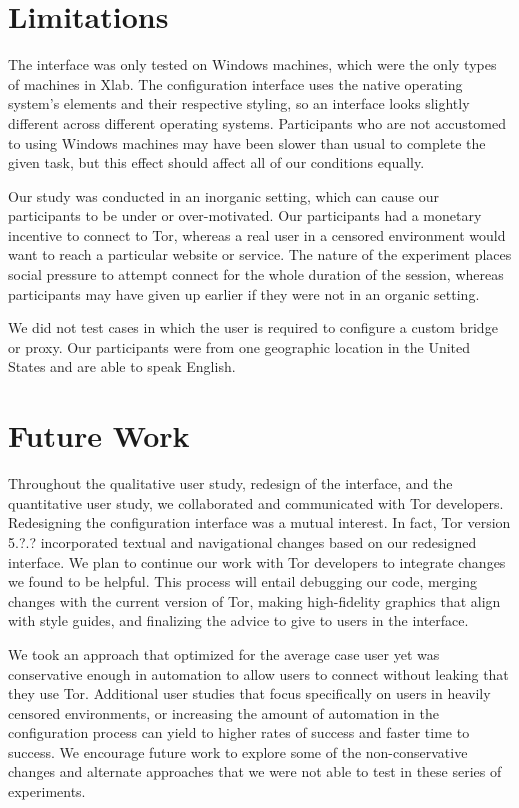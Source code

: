 \documentclass[USenglish,oneside,twocolumn]{article}
\begin{document}
\section{Limitations} 
The interface was only tested on Windows machines, which were the only types of machines in Xlab. The configuration interface uses the native operating system's elements and their respective styling, so an interface looks slightly different across different operating systems. Participants who are not accustomed to using Windows machines may have been slower than usual to complete the given task, but this effect should affect all of our conditions equally. 

Our study was conducted in an inorganic setting, which can cause our participants to be under or over-motivated. Our participants had a monetary incentive to connect to Tor, whereas a real user in a censored environment would want to reach a particular website or service. The nature of the experiment places social pressure to attempt connect for the whole duration of the session, whereas participants may have given up earlier if they were not in an organic setting.   

We did not test cases in which the user is required to configure a custom bridge or proxy. Our participants were from one geographic location in the United States and are able to speak English.

\section{Future Work} 
Throughout the qualitative user study, redesign of the interface, and the quantitative user study, we collaborated and communicated with Tor developers. Redesigning the configuration interface was a mutual interest. In fact, Tor version {\color{red} 5.?.?} incorporated textual and navigational changes based on our redesigned interface. We plan to continue our work with Tor developers to integrate changes we found to be helpful. This process will entail debugging our code, merging changes with the current version of Tor, making high-fidelity graphics that align with style guides, and finalizing the advice to give to users in the interface. 

We took an approach that optimized for the average case user yet was conservative enough in automation to allow users to connect without leaking that they use Tor. Additional user studies that focus specifically on users in heavily censored environments, or increasing the amount of automation in the configuration process can yield to higher rates of success and faster time to success. We encourage future work to explore some of the non-conservative changes and alternate approaches that we were not able to test in these series of experiments.\\
\end{document}
